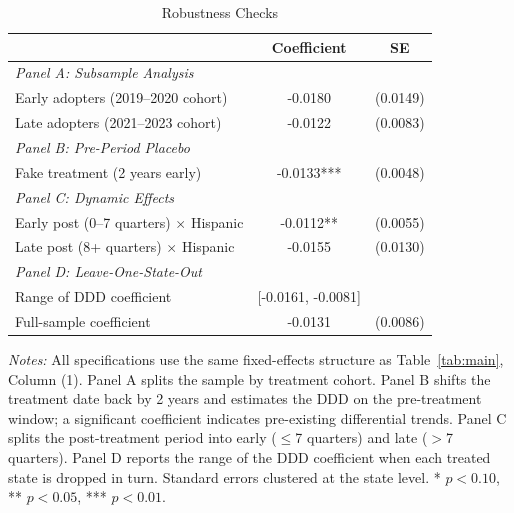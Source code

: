 \begin{table}[H]
\centering
\caption{Robustness Checks}
\label{tab:robust}
\begin{threeparttable}
\begin{tabular}{lcc}
\toprule
 & Coefficient & SE \\
\midrule
\multicolumn{3}{l}{\textit{Panel A: Subsample Analysis}} \\
\quad Early adopters (2019--2020 cohort) & -0.0180 & (0.0149) \\
\quad Late adopters (2021--2023 cohort) & -0.0122 & (0.0083) \\
\midrule
\multicolumn{3}{l}{\textit{Panel B: Pre-Period Placebo}} \\
\quad Fake treatment (2 years early) & -0.0133*** & (0.0048) \\
\midrule
\multicolumn{3}{l}{\textit{Panel C: Dynamic Effects}} \\
\quad Early post (0--7 quarters) $\times$ Hispanic & -0.0112** & (0.0055) \\
\quad Late post (8+ quarters) $\times$ Hispanic & -0.0155 & (0.0130) \\
\midrule
\multicolumn{3}{l}{\textit{Panel D: Leave-One-State-Out}} \\
\quad Range of DDD coefficient & [-0.0161, -0.0081] & \\
\quad Full-sample coefficient & -0.0131 & (0.0086) \\
\bottomrule
\end{tabular}
\begin{tablenotes}[flushleft]
\small
\item \textit{Notes:} All specifications use the same fixed-effects structure as Table~\ref{tab:main}, Column (1). Panel A splits the sample by treatment cohort. Panel B shifts the treatment date back by 2 years and estimates the DDD on the pre-treatment window; a significant coefficient indicates pre-existing differential trends. Panel C splits the post-treatment period into early ($\leq$7 quarters) and late ($>$7 quarters). Panel D reports the range of the DDD coefficient when each treated state is dropped in turn. Standard errors clustered at the state level. * $p<0.10$, ** $p<0.05$, *** $p<0.01$.
\end{tablenotes}
\end{threeparttable}
\end{table}
